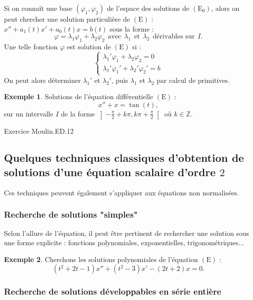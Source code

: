 \documentclass[french]{article}
\newcommand{\Z}{\mathbb{Z}}
\theoremstyle{plain}
\theoremstyle{definition}
\newtheorem*{ex}{Exemple}
\theoremstyle{remark}
\begin{document}
\begin{met}
	Si on connaît une base $(\varphi_1,\varphi_2)$ de l'espace des solutions de $(\text{E}_0)$, alors on peut chercher une solution particulière de $(\text{E})$ : $x''+a_1(t)x'+a_0(t)x=b(t)$ sous la forme : $$\varphi =\lambda_1\varphi_1+\lambda_2\varphi_2\ \ \text{avec}\ \ \lambda_1\ \ \text{et}\ \ \lambda_2\ \ \text{dérivables sur} \ \ I.$$ Une telle fonction $\varphi$ est solution de $(\text{E})$ si : $$\begin{cases}
		\lambda_1'\varphi_1+\lambda_2\varphi_2=0 \\
		\lambda_1'\varphi_1'+\lambda_2'\varphi_2'=b
	\end{cases}$$ On peut alors déterminer $\lambda_1'$ et $\lambda_2'$, puis $\lambda_1$ et $\lambda_2$ par calcul de primitives.
\end{met}

\begin{ex}
	Solutions de l'équation différentielle $(\text{E})$ :
	$$x''+x=\tan(t),$$
	sur un intervalle $I$ de la forme $\displaystyle\left]-\frac{\pi}{2}+k\pi,k\pi+\frac{\pi}{2}\right[$ où $k\in\Z$.
\end{ex}

Exercice Moulin.ED.12

\subsection{Quelques techniques classiques d'obtention de solutions d'une équation scalaire d'ordre $2$}

Ces techniques peuvent également s'appliquer aux équations non normalisées.

\subsubsection*{Recherche de solutions "simples"}

Selon l'allure de l'équation, il peut être pertinent de rechercher une solution sous une forme explicite : fonctions polynomiales, exponentielles, trigonométriques...

\begin{ex}
	Cherchons les solutions polynomiales de l'équation $(\text{E})$ :
	$$(t^2+2t-1)x''+(t^2-3)x'-(2t+2)x=0.$$
\end{ex}

\subsubsection*{Recherche de solutions développables en série entière}
\end{document}

